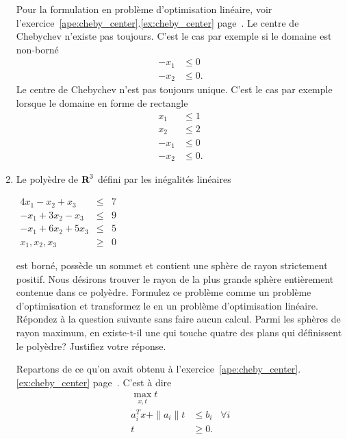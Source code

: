 \begin{enumerate}
    \begin{solution}
      Pour la formulation en problème d'optimisation linéaire,
      voir l'exercice~\ref{ape:cheby_center}.\ref{ex:cheby_center}
      page~\pageref{ex:cheby_center}.
      Le centre de Chebychev n'existe pas toujours.
      C'est le cas par exemple si le domaine est non-borné
      \begin{align*}
        -x_1 & \leq 0\\
        -x_2 & \leq 0.
      \end{align*}
      Le centre de Chebychev n'est pas toujours unique.
      C'est le cas par exemple lorsque le domaine en forme de rectangle
      \begin{align*}
        x_1 & \leq 1\\
        x_2 & \leq 2\\
        -x_1 & \leq 0\\
        -x_2 & \leq 0.
      \end{align*}
    \end{solution}

  \item  Le poly\`edre de ${\mbox{\bf R}}^3$ défini par les inégalités linéaires

    $
    \begin{array}{rcr}
      4x_1- x_2 +x_3 & \leq & 7\\
      -x_1 +3x_2 -x_3 & \leq & 9\\
      -x_1 + 6 x_2 +5 x_3 & \leq & 5\\
      x_1, x_2, x_3 & \geq & 0
    \end{array}
    $

    est borné, possède un sommet et contient une sphère de rayon strictement positif. Nous désirons trouver le rayon de la plus grande
    sphère entièrement contenue dans ce poly\`edre. Formulez ce problème comme un problème d'optimisation et transformez le en un
    problème d'optimisation linéaire.  Répondez à la question suivante sans faire aucun calcul. Parmi les sphères de rayon
    maximum, en existe-t-il une qui touche quatre des plans qui définissent le poly\`edre? Justifiez votre réponse.



    \begin{solution}
      Repartons de ce qu'on avait obtenu à
      l'exercice~\ref{ape:cheby_center}.\ref{ex:cheby_center}
      page~\pageref{ex:cheby_center}.
      C'est à dire
      \begin{align*}
        \max_{x, t} t\\
        a_i^Tx + \|a_i\|t & \leq b_i & \forall i\\
        t & \geq 0.
      \end{align*}


\end{solution}
\end{enumerate}
